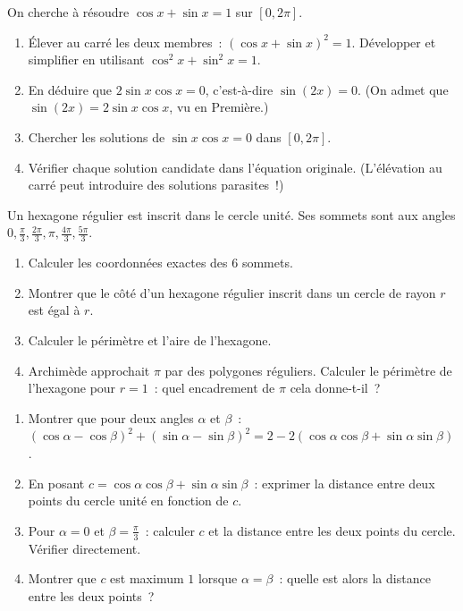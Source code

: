 \begin{challenge}[Equation $a\cos x+b\sin x=c$]
On cherche \`a r\'esoudre $\cos x+\sin x=1$ sur $[0,2\pi]$.
\begin{enumerate}
  \item \'Elever au carr\'e les deux membres~: $(\cos x+\sin x)^2=1$.
        D\'evelopper et simplifier en utilisant $\cos^2x+\sin^2x=1$.
  \item En d\'eduire que $2\sin x\cos x=0$, c'est-\`a-dire $\sin(2x)=0$.
        (On admet que $\sin(2x)=2\sin x\cos x$, vu en Premi\`ere.)
  \item Chercher les solutions de $\sin x\cos x=0$ dans $[0,2\pi]$.
  \item V\'erifier chaque solution candidate dans l'\'equation originale.
        (L'\'el\'evation au carr\'e peut introduire des solutions parasites~!)
\end{enumerate}
\end{challenge}

\begin{challenge}
Un hexagone r\'egulier est inscrit dans le cercle unit\'e.
Ses sommets sont aux angles $0, \frac{\pi}{3}, \frac{2\pi}{3}, \pi, \frac{4\pi}{3}, \frac{5\pi}{3}$.
\begin{enumerate}
  \item Calculer les coordonn\'ees exactes des $6$ sommets.
  \item Montrer que le c\^ot\'e d'un hexagone r\'egulier inscrit dans
        un cercle de rayon $r$ est \'egal \`a $r$.
  \item Calculer le p\'erim\`etre et l'aire de l'hexagone.
  \item Archim\`ede approchait $\pi$ par des polygones r\'eguliers.
        Calculer le p\'erim\`etre de l'hexagone pour $r=1$~:
        quel encadrement de $\pi$ cela donne-t-il~?
\end{enumerate}
\end{challenge}

\begin{challenge}
\begin{enumerate}
  \item Montrer que pour deux angles $\alpha$ et $\beta$~:
        $(\cos\alpha-\cos\beta)^2+(\sin\alpha-\sin\beta)^2
        = 2 - 2(\cos\alpha\cos\beta+\sin\alpha\sin\beta)$.
  \item En posant $c=\cos\alpha\cos\beta+\sin\alpha\sin\beta$~:
        exprimer la distance entre deux points du cercle unit\'e
        en fonction de $c$.
  \item Pour $\alpha=0$ et $\beta=\frac{\pi}{3}$~: calculer $c$ et la distance
        entre les deux points du cercle. V\'erifier directement.
  \item Montrer que $c$ est maximum $1$ lorsque $\alpha=\beta$~:
        quelle est alors la distance entre les deux points~?
\end{enumerate}
\end{challenge}


